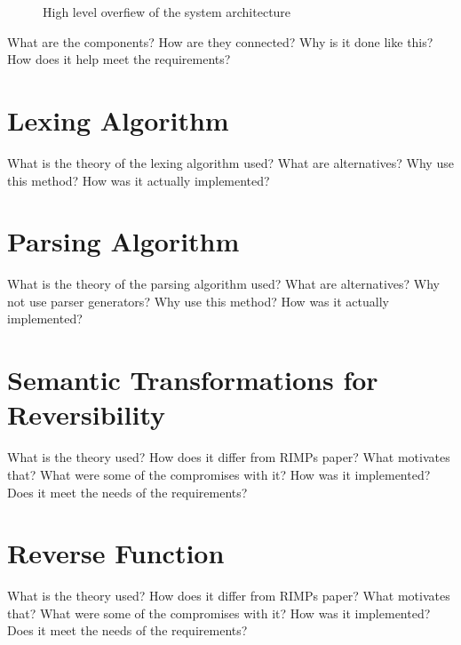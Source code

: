 \begin{center}
\begin{figure}[hbt!]
\caption{High level overfiew of the system architecture}
\label{fig:system_architecture}
\end{figure}
\end{center}

What are the components?
How are they connected?
Why is it done like this?
How does it help meet the requirements?

\section{Lexing Algorithm}
What is the theory of the lexing algorithm used?
What are alternatives?
Why use this method?
How was it actually implemented?

\section{Parsing Algorithm}
What is the theory of the parsing algorithm used?
What are alternatives?
Why not use parser generators?
Why use this method?
How was it actually implemented?

\section{Semantic Transformations for Reversibility}
What is the theory used?
How does it differ from RIMPs paper?
What motivates that?
What were some of the compromises with it?
How was it implemented?
Does it meet the needs of the requirements?

\section{Reverse Function}
What is the theory used?
How does it differ from RIMPs paper?
What motivates that?
What were some of the compromises with it?
How was it implemented?
Does it meet the needs of the requirements?

